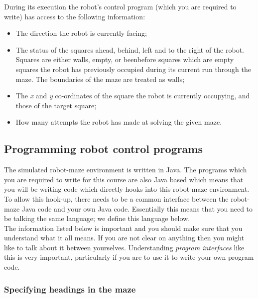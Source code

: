 During its execution the robot's control program (which you are required to
write) has access to the following information:

\begin{itemize}

\item The direction the robot is currently facing;

\item The status of the squares ahead, behind, left and to the right of the
  robot.  Squares are either walls, empty, or beenbefore squares which are 
  empty squares the robot
  has previously occupied during its current run through the maze.  The
  boundaries of the maze are treated as walls;

\item The {\it x} and {\it y} co-ordinates of the square the robot is currently
  occupying, and those of the target square;

\item How many attempts the robot has made at solving the given maze.

\end{itemize}


\subsection{Programming robot control programs}

The simulated robot-maze environment is written in Java. The programs which 
you are required to write for this course are also Java based which means 
that you will be writing code which directly hooks into this robot-maze
environment. \\

\noindent
To allow this hook-up, there needs to be a common interface between the 
robot-maze Java code and your own Java code. Essentially this means that 
you need to be talking the same language; we define this language below.\\

\noindent
The information listed below is important and you should make sure that you 
understand what it all means. If you are not clear on anything then you 
might like to talk about it between yourselves. Understanding {\em 
program interfaces} like this is very important, particularly if you are to 
use it to write your own program code.

\subsubsection{Specifying headings in the maze}

